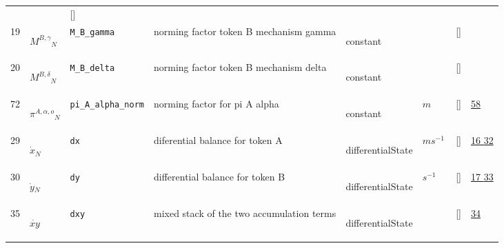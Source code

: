 \begin{longtable}{|p{1cm}|p{3cm}|p{3cm}|p{7cm}|p{3.0cm}|p{3cm}|p{2cm}|p{1cm}|}
             & $  $
             & []
             & \\
    19
             & \hypertarget{"v:19"}{ $ {{M^{B,\gamma}}}{_{N}} $}
             & \verb|M_B_gamma|
             & norming factor token B mechanism gamma
             & \begin{lay}constant \end{lay}
             & $  $
             & []
             & \\
    20
             & \hypertarget{"v:20"}{ $ {{M^{B,\delta}}}{_{N}} $}
             & \verb|M_B_delta|
             & norming factor token B mechanism delta
             & \begin{lay}constant \end{lay}
             & $  $
             & []
             & \\
    72
             & \hypertarget{"v:72"}{ $ {{\pi^{A,\alpha,o}}}{_{N}} $}
             & \verb|pi_A_alpha_norm|
             & norming factor for pi A alpha
             & \begin{lay}constant \end{lay}
             & $ m  $
             & []
             & \hyperlink{"e:58"}{ 58 }
                 \\
    29
             & \hypertarget{"v:29"}{ $ {{\dot{x}}}{_{N}} $}
             & \verb|dx|
             & diferential balance for token A
             & \begin{lay}differentialState \end{lay}
             & $ m s^{-1} \, $
             & []
             & \hyperlink{"e:16"}{ 16 }
                 \hyperlink{"e:32"}{ 32 }
                 \\
    30
             & \hypertarget{"v:30"}{ $ {{\dot{y}}}{_{N}} $}
             & \verb|dy|
             & differential balance for token B
             & \begin{lay}differentialState \end{lay}
             & $ s^{-1} \, $
             & []
             & \hyperlink{"e:17"}{ 17 }
                 \hyperlink{"e:33"}{ 33 }
                 \\
    35
             & \hypertarget{"v:35"}{ $ {{\dot{xy}}}{_{}} $}
             & \verb|dxy|
             & mixed stack of the two accumulation terms
             & \begin{lay}differentialState \end{lay}
             & $  $
             & []
             & \hyperlink{"e:34"}{ 34 }
                 \\

\end{longtable}
